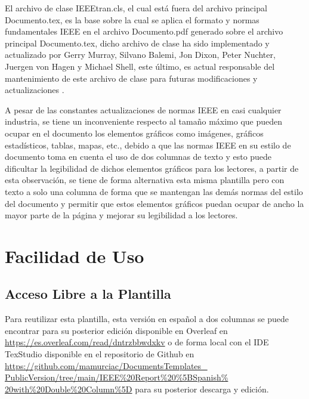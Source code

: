 \documentclass[letterpaper, 10pt, conference]{IEEEtran} %
\begin{document}
	El archivo de clase IEEEtran.cls, el cual está fuera del archivo principal Documento.tex, es la base sobre la cual se aplica el formato y normas fundamentales IEEE en el archivo Documento.pdf generado sobre el archivo principal Documento.tex, dicho archivo de clase ha sido implementado y actualizado por Gerry Murray, Silvano Balemi, Jon Dixon, Peter Nuchter, Juergen von Hagen y Michael Shell, este último, es actual responsable del mantenimiento de este archivo de clase para futuras modificaciones y actualizaciones \cite{referenciaBibliografica2}.
	
	A pesar de las constantes actualizaciones de normas IEEE en casi cualquier industria, se tiene un inconveniente respecto al tamaño máximo que pueden ocupar en el documento los elementos gráficos como imágenes, gráficos estadísticos, tablas, mapas, etc., debido a que las normas IEEE en su estilo de documento toma en cuenta el uso de dos columnas de texto y esto puede dificultar la legibilidad de dichos elementos gráficos para los lectores, a partir de esta observación, se tiene de forma alternativa esta misma plantilla pero con texto a solo una columna de forma que se mantengan las demás normas del estilo del documento y permitir que estos elementos gráficos puedan ocupar de ancho la mayor parte de la página y mejorar su legibilidad a los lectores.
	
	\section{Facilidad de Uso} \label{seccionFacilidadDeUso}
	\subsection{Acceso Libre a la Plantilla} \label{subseccionAccesoLibreALaPlantilla}
	Para reutilizar esta plantilla, esta versión en español a dos columnas se puede encontrar para su posterior edición disponible en Overleaf en \href{https://es.overleaf.com/read/dntrzbbwdxkv}{https://es.overleaf.com/read/dntrzbbwdxkv} o de forma local con el IDE TexStudio disponible en el repositorio de Github en \href{https://github.com/mamurciac/DocumentsTemplates_PublicVersion/tree/main/IEEE%20Report%20%5BSpanish%20with%20Double%20Column%5D}{https://github.com/mamurciac/DocumentsTemplates\_ PublicVersion/tree/main/IEEE\%20Report\%20\%5BSpanish\% 20with\%20Double\%20Column\%5D} para su posterior descarga y edición.
	
\end{document}
